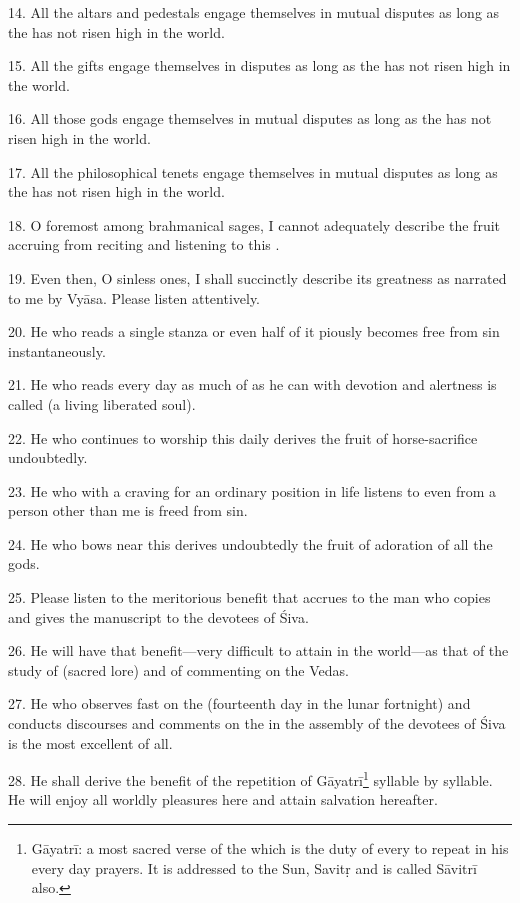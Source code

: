 14. All the altars and pedestals engage themselves in mutual disputes as long as
the  has not risen high in the world.

15. All the gifts engage themselves in disputes as long as the 
has not risen high in the world.

16. All those gods engage themselves in mutual disputes as long as the
 has not risen high in the world.

17. All the philosophical tenets engage themselves in mutual disputes as long as
the  has not risen high in the world.

18. O foremost among brahmanical sages, I cannot adequately describe the fruit
accruing from reciting and listening to this .

19. Even then, O sinless ones, I shall succinctly describe its greatness as
narrated to me by Vyāsa. Please listen attentively.

20. He who reads a single stanza or even half of it piously becomes free from
sin instantaneously.

21. He who reads every day as much of  as he can with devotion
and alertness is called  (a living liberated soul).

22. He who continues to worship this  daily derives the fruit of
horse-sacrifice undoubtedly.

23. He who with a craving for an ordinary position in life listens to
 even from a person other than me is freed from sin.

24. He who bows near this  derives undoubtedly the fruit of
adoration of all the gods.

25. Please listen to the meritorious benefit that accrues to the man who copies
 and gives the manuscript to the devotees of Śiva.

26. He will have that benefit—very difficult to attain in the world—as that of
the study of  (sacred lore) and of commenting on the Vedas.

27. He who observes fast on the  (fourteenth day in the lunar
fortnight) and conducts discourses and comments on the  in the
assembly of the devotees of Śiva is the most excellent of all.

28. He shall derive the benefit of the repetition of Gāyatrī\footnote{Gāyatrī:
a most sacred verse of the  which is the duty of every 
to repeat in his every day prayers. It is addressed to the Sun, Savitṛ and is
called Sāvitrī also.} syllable by syllable. He will enjoy all worldly pleasures
here and attain salvation hereafter.


